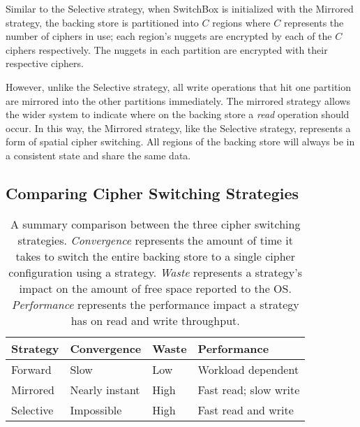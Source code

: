Similar to the Selective strategy, when SwitchBox is initialized with the
Mirrored strategy, the backing store is partitioned into $C$ regions where $C$
represents the number of ciphers in use; each region's nuggets are encrypted by
each of the $C$ ciphers respectively. The nuggets in each partition are
encrypted with their respective ciphers.

However, unlike the Selective strategy, all write operations that hit one
partition are mirrored into the other partitions immediately. The mirrored
strategy allows the wider system to indicate where on the backing store a
\emph{read} operation should occur. In this way, the Mirrored strategy, like the
Selective strategy, represents a form of spatial cipher switching. All regions
of the backing store will always be in a consistent state and share the same
data.

\subsection{Comparing Cipher Switching Strategies}

\begin{table}[]
   \begin{tabular}{@{}llll@{}}
   \toprule
   \textbf{Strategy} & \textbf{Convergence} & \textbf{Waste} & \textbf{Performance} \\ \midrule
   Forward   & Slow           & Low  & Workload dependent    \\
   Mirrored  & Nearly instant & High & Fast read; slow write \\
   Selective & Impossible     & High & Fast read and write   \\
   \end{tabular}
   \caption{A summary comparison between the three cipher switching strategies.
   \emph{Convergence} represents the amount of time it takes to switch the
   entire backing store to a single cipher configuration using a strategy.
   \emph{Waste} represents a strategy's impact on the amount of free space
   reported to the OS. \emph{Performance} represents the performance impact a
   strategy has on read and write throughput.}
   \label{tbl:strategies-advantages}
\end{table}

 

